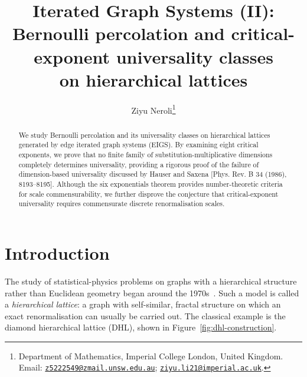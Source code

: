\documentclass[scheme=plain,11pt]{ctexart}
\title{Iterated Graph Systems (II):\\
Bernoulli percolation and critical-exponent universality classes \\
on hierarchical lattices}
\author{Ziyu Neroli\thanks{Department of Mathematics, Imperial College London, United Kingdom. Email: \href{mailto:z5222549@zmail.unsw.edu.au}{\texttt{z5222549@zmail.unsw.edu.au}}; \href{mailto:ziyu.li21@imperial.ac.uk}{\texttt{ziyu.li21@imperial.ac.uk}}.}}
\date{}
\theoremstyle{definition}
\theoremstyle{remark}
\begin{document}
\maketitle
\begin{abstract}
We study Bernoulli percolation and its universality classes on hierarchical lattices generated by edge iterated graph systems (EIGS). 
By examining eight critical exponents, we prove that no finite family of substitution-multiplicative dimensions completely determines universality, providing a rigorous proof of the failure of dimension-based universality discussed by Hauser and Saxena [Phys. Rev. B 34 (1986), 8193–8195]. 
Although the six exponentials theorem provides number-theoretic criteria for scale commensurability, we further disprove the conjecture that critical-exponent universality requires commensurate discrete renormalisation scales.
\end{abstract}
\tableofcontents


\section{Introduction}


The study of statistical-physics problems on graphs with a hierarchical structure rather than Euclidean geometry began around the 1970s~\cites{berker1979renormalisation,kaufman1981exactly,griffiths1982spin}.
Such a model is called a \emph{hierarchical lattice}: a graph with self-similar, fractal structure on which an exact renormalisation can usually be carried out.
The classical example is the diamond hierarchical lattice (DHL), shown in Figure~\ref{fig:dhl-construction}.
\end{document}
